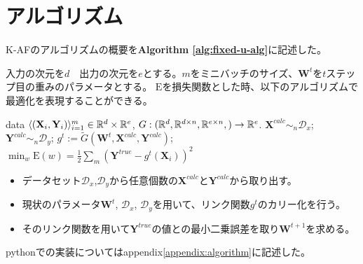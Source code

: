 \section{アルゴリズム}
\label{al}
K-AFのアルゴリズムの概要を{\bf Algorithm \ref{alg:fixed-u-alg}}に記述した。

入力の次元を$ d $　出力の次元を$ e $とする。$ m $をミニバッチのサイズ、$ \mathbf{W}^t $を$t$ステップ目の重みのパラメータとする。
$ \mathrm{E} $を損失関数とした時、以下のアルゴリズムで最適化を表現することができる。



\begin{algorithm}[]
	\caption{\KAF}
	\label{alg:fixed-u-alg}
\begin{algorithmic}
	 data $\langle (\mathbf{X}_i, \mathbf{Y}_i) \rangle_{i=1}^m \in
	\mathbb{R}^d \times \mathbb{R}^e$, $G: ( \mathbb{R}^d, \mathbb{R}^{d \times n}, \mathbb{R}^{e \times n}, ) \rightarrow  \mathbb{R}^e$.
	\STATE $\mathbf{X}^{calc} \sim_n \mathcal{D}_x$;
    \STATE $\mathbf{Y}^{calc} \sim_n \mathcal{D}_y$;
	\STATE $g^t := \tilde{G}(\mathbf{W}^t, \mathbf{X}^{calc}, \mathbf{Y}^{calc} )$;
	\STATE $ \displaystyle{\min_{w} \mathrm{E}(w)} = \frac{1}{2}\sum_m (\mathbf{Y}^{true} - g^t(\mathbf{X}_i))^2 $
	\ENDFOR
\end{algorithmic}
\end{algorithm}

\begin{itemize}
  \item データセット$\mathcal{D}_x$,$\mathcal{D}_y$から任意個数の$ \mathbf{X}^{calc} $と$ \mathbf{Y}^{calc} $から取り出す。
  \item 現状のパラメータ$ \mathbf{W}^t $, $\mathcal{D}_x$, $\mathcal{D}_y$を用いて、リンク関数$ g^t $のカリー化を行う。
  \item そのリンク関数を用いて$ \mathbf{Y}^{true} $の値との最小二乗誤差を取り$ \mathbf{W}^{t+1} $を求める。
\end{itemize}


pythonでの実装についてはappendix\ref{appendix:algorithm}に記述した。






